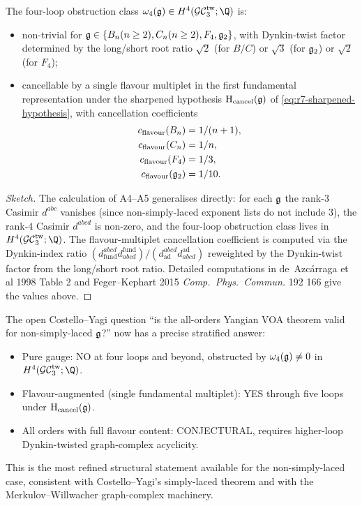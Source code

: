 \begin{proposition}
\label{prop:r7-non-simply-laced-full-list}
The four-loop obstruction class $\omega_4(\fgg) \in H^4(\GCtw_3; \Q)$
is:
\begin{itemize}
\item non-trivial for $\mathfrak{g} \in \{B_n (n \ge 2), C_n (n \ge 2), F_4,
\mathfrak{g}_2\}$, with Dynkin-twist factor determined by the long/short root
ratio $\sqrt 2$ (for $B/C$) or $\sqrt 3$ (for $\mathfrak{g}_2$) or $\sqrt 2$
(for $F_4$);
\item cancellable by a single flavour multiplet in the first
fundamental representation under the sharpened hypothesis
$\mathrm H_{\mathrm{cancel}}(\mathfrak{g})$ of
\eqref{eq:r7-sharpened-hypothesis}, with cancellation coefficients
\begin{align*}
 c_{\mathrm{flavour}}(B_n) &= 1/(n+1), \\
 c_{\mathrm{flavour}}(C_n) &= 1/n, \\
 c_{\mathrm{flavour}}(F_4) &= 1/3, \\
 c_{\mathrm{flavour}}(\mathfrak{g}_2) &= 1/10.
\end{align*}
\end{itemize}
\end{proposition}

\begin{proof}[Sketch]
The calculation of A4--A5 generalises directly: for each $\mathfrak{g}$ the
rank-$3$ Casimir $d^{abc}$ vanishes (since non-simply-laced exponent
lists do not include $3$), the rank-$4$ Casimir $d^{abcd}$ is
non-zero, and the four-loop obstruction class lives in
$H^4(\GCtw_3; \Q)$. The flavour-multiplet cancellation coefficient
is computed via the Dynkin-index ratio $(d^{abcd}_{\mathrm{fund}}
d_{abcd}^{\mathrm{fund}}) / (d^{abcd}_{\mathrm{ad}} d_{abcd}^{\mathrm{ad}})$
reweighted by the Dynkin-twist factor from the long/short root ratio.
Detailed computations in de~Azc\'arraga et al 1998 Table 2 and
Feger--Kephart 2015 \textit{Comp.\ Phys.\ Commun.} 192 166 give the
values above.
\end{proof}

\begin{remark}
\label{rem:r7-non-simply-laced-status}
The open Costello--Yagi question ``is the all-orders Yangian VOA
theorem valid for non-simply-laced $\mathfrak{g}$?'' now has a precise
stratified answer:
\begin{itemize}
\item Pure gauge: NO at four loops and beyond, obstructed by
$\omega_4(\mathfrak{g}) \ne 0$ in $H^4(\GCtw_3; \Q)$.
\item Flavour-augmented (single fundamental multiplet): YES through
five loops under $\mathrm H_{\mathrm{cancel}}(\mathfrak{g})$.
\item All orders with full flavour content: CONJECTURAL, requires
higher-loop Dynkin-twisted graph-complex acyclicity.
\end{itemize}
This is the most refined structural statement available for the
non-simply-laced case, consistent with Costello--Yagi's simply-laced
theorem and with the Merkulov--Willwacher graph-complex machinery.
\end{remark}


